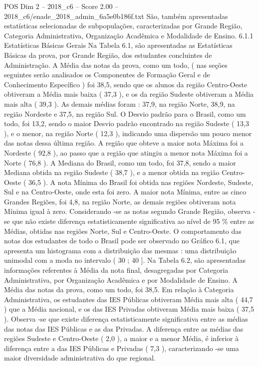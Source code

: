 \begin{textsample}{POS Dim 2 – 2018\_c6 – Score 2.00 – 2018\_c6/enade\_2018\_admin\_6a5e0b186f.txt}
São, também apresentadas estatísticas selecionadas de subpopulações, caracterizadas por Grande Região, Categoria Administrativa, Organização Acadêmica e Modalidade de Ensino. 6.1.1 Estatísticas Básicas Gerais Na Tabela 6.1, são apresentadas as Estatísticas Básicas da prova, por Grande Região, dos estudantes concluintes de Administração.
A Média das notas da prova, como um todo, ( nas seções seguintes serão analisados os Componentes de Formação Geral e de Conhecimento Específico ) foi 38,5, sendo que os alunos da região Centro-Oeste obtiveram a Média mais baixa ( 37,3 ), e os da região Sudeste obtiveram a Média mais alta ( 39,3 ).
As demais médias foram : 37,9, na região Norte, 38,9, na região Nordeste e 37,5, na região Sul.
O Desvio padrão para o Brasil, como um todo, foi 13,2, sendo o maior Desvio padrão encontrado na região Sudeste ( 13,3 ), e o menor, na região Norte ( 12,3 ), indicando uma dispersão um pouco menor das notas dessa última região.
A região que obteve a maior nota Máxima foi a Nordeste ( 92,8 ), ao passo que a região que atingiu a menor nota Máxima foi a Norte ( 76,8 ).
A Mediana do Brasil, como um todo, foi 37,8, sendo a maior Mediana obtida na região Sudeste ( 38,7 ), e a menor obtida na região Centro-Oeste ( 36,5 ).
A nota Mínima do Brasil foi obtida nas regiões Nordeste, Sudeste, Sul e na Centro-Oeste, onde esta foi zero.
A maior nota Mínima, entre as cinco Grandes Regiões, foi 4,8, na região Norte, as demais regiões obtiveram nota Mínima igual à zero.
Considerando -se as notas segundo Grande Região, observa -se que não existe diferença estatisticamente significativa ao nível de 95 \% entre as Médias, obtidas nas regiões Norte, Sul e Centro-Oeste.
O comportamento das notas dos estudantes de todo o Brasil pode ser observado no Gráfico 6.1, que apresenta um histograma com a distribuição das mesmas : uma distribuição unimodal com a moda no intervalo ( 30 ; 40 ].
Na Tabela 6.2, são apresentadas informações referentes à Média da nota final, desagregadas por Categoria Administrativa, por Organização Acadêmica e por Modalidade de Ensino.
A Média das notas da prova, como um todo, foi 38,5.
Em relação à Categoria Administrativa, os estudantes das IES Públicas obtiveram Média mais alta ( 44,7 ) que a Média nacional, e os das IES Privadas obtiveram Média mais baixa ( 37,5 ).
Observa -se que existe diferença estatisticamente significativa entre as médias das notas das IES Públicas e as das Privadas.
A diferença entre as médias das regiões Sudeste e Centro-Oeste ( 2,0 ), a maior e a menor Média, é inferior à diferença entre a das IES Públicas e Privadas ( 7,3 ), caracterizando -se uma maior diversidade administrativa do que regional.

\end{textsample}
